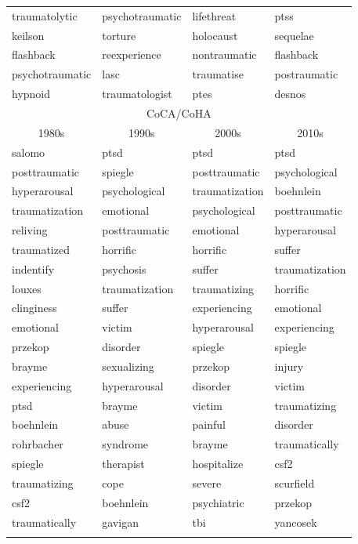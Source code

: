 \documentclass[output=paper]{langsci/langscibook}
\begin{document}
\begin{table}
\begin{tabular}{llll}
traumatolytic&psychotraumatic&lifethreat&ptss          \\   
keilson&torture&holocaust&sequelae                     \\   
flashback&reexperience&nontraumatic&flashback          \\   
psychotraumatic&lasc&traumatise&postraumatic           \\   
hypnoid&traumatologist&ptes&desnos                     \\ \midrule
\multicolumn{4}{c}{CoCA/CoHA}\\
\multicolumn{1}{c}{1980s} & \multicolumn{1}{c}{1990s}  & \multicolumn{1}{c}{2000s} & \multicolumn{1}{c}{2010s}\\\midrule
salomo&ptsd&ptsd&ptsd\\
posttraumatic&spiegle&posttraumatic&psychological\\
hyperarousal&psychological&traumatization&boehnlein\\
traumatization&emotional&psychological&posttraumatic\\
reliving&posttraumatic&emotional&hyperarousal\\
traumatized&horrific&horrific&suffer\\
indentify&psychosis&suffer&traumatization\\
louxes&traumatization&traumatizing&horrific\\
clinginess&suffer&experiencing&emotional\\
emotional&victim&hyperarousal&experiencing\\
przekop&disorder&spiegle&spiegle\\
brayme&sexualizing&przekop&injury\\
experiencing&hyperarousal&disorder&victim\\
ptsd&brayme&victim&traumatizing\\
boehnlein&abuse&painful&disorder\\
rohrbacher&syndrome&brayme&traumatically\\
spiegle&therapist&hospitalize&csf2\\
traumatizing&cope&severe&scurfield\\
csf2&boehnlein&psychiatric&przekop\\
traumatically&gavigan&tbi&yancosek\\  
\lspbottomrule
\end{tabular}
\end{table}
\end{document}
